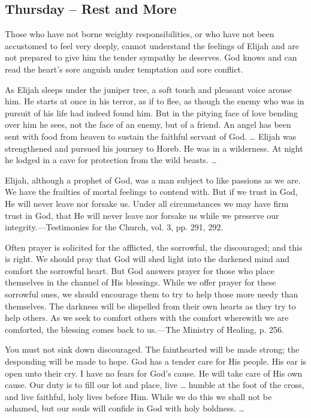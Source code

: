 \documentclass[a4paper, 10pt, twoside, headings=small]{scrartcl}
\begin{document}
\begin{multicols}{2}
\section*{Thursday – Rest and More}

Those who have not borne weighty responsibilities, or who have not been accustomed to feel very deeply, cannot understand the feelings of Elijah and are not prepared to give him the tender sympathy he deserves. God knows and can read the heart’s sore anguish under temptation and sore conflict.

As Elijah sleeps under the juniper tree, a soft touch and pleasant voice arouse him. He starts at once in his terror, as if to flee, as though the enemy who was in pursuit of his life had indeed found him. But in the pitying face of love bending over him he sees, not the face of an enemy, but of a friend. An angel has been sent with food from heaven to sustain the faithful servant of God. … Elijah was strengthened and pursued his journey to Horeb. He was in a wilderness. At night he lodged in a cave for protection from the wild beasts. …

Elijah, although a prophet of God, was a man subject to like passions as we are. We have the frailties of mortal feelings to contend with. But if we trust in God, He will never leave nor forsake us. Under all circumstances we may have firm trust in God, that He will never leave nor forsake us while we preserve our integrity.—Testimonies for the Church, vol. 3, pp. 291, 292.

Often prayer is solicited for the afflicted, the sorrowful, the discouraged; and this is right. We should pray that God will shed light into the darkened mind and comfort the sorrowful heart. But God answers prayer for those who place themselves in the channel of His blessings. While we offer prayer for these sorrowful ones, we should encourage them to try to help those more needy than themselves. The darkness will be dispelled from their own hearts as they try to help others. As we seek to comfort others with the comfort wherewith we are comforted, the blessing comes back to us.—The Ministry of Healing, p. 256.

You must not sink down discouraged. The fainthearted will be made strong; the desponding will be made to hope. God has a tender care for His people. His ear is open unto their cry. I have no fears for God’s cause. He will take care of His own cause. Our duty is to fill our lot and place, live … humble at the foot of the cross, and live faithful, holy lives before Him. While we do this we shall not be ashamed, but our souls will confide in God with holy boldness. …


\end{multicols}
\end{document}
